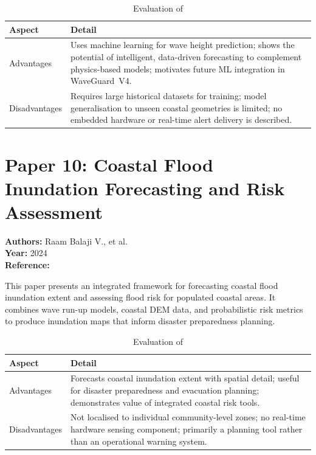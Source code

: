 \begin{table}[H]
\centering
\caption{Evaluation of \cite{durap2024waveheight}}
\label{tab:paper9}
\begin{tabularx}{\textwidth}{lX}
\toprule
\textbf{Aspect} & \textbf{Detail} \\
\midrule
Advantages &
  Uses machine learning for wave height prediction;
  shows the potential of intelligent, data-driven forecasting to complement
  physics-based models;
  motivates future ML integration in WaveGuard~V4. \\
\addlinespace
Disadvantages &
  Requires large historical datasets for training;
  model generalisation to unseen coastal geometries is limited;
  no embedded hardware or real-time alert delivery is described. \\
\bottomrule
\end{tabularx}
\end{table}

\section{Paper 10: Coastal Flood Inundation Forecasting and Risk Assessment}

\textbf{Authors:} Raam Balaji V., et al.\\
\textbf{Year:} 2024\\
\textbf{Reference:} \cite{balaji2024inundation}

This paper presents an integrated framework for forecasting coastal flood inundation
extent and assessing flood risk for populated coastal areas.
It combines wave run-up models, coastal DEM data, and probabilistic risk metrics to
produce inundation maps that inform disaster preparedness planning.

\begin{table}[H]
\centering
\caption{Evaluation of \cite{balaji2024inundation}}
\label{tab:paper10}
\begin{tabularx}{\textwidth}{lX}
\toprule
\textbf{Aspect} & \textbf{Detail} \\
\midrule
Advantages &
  Forecasts coastal inundation extent with spatial detail;
  useful for disaster preparedness and evacuation planning;
  demonstrates value of integrated coastal risk tools. \\
\addlinespace
Disadvantages &
  Not localised to individual community-level zones;
  no real-time hardware sensing component;
  primarily a planning tool rather than an operational warning system. \\
\bottomrule
\end{tabularx}
\end{table}


